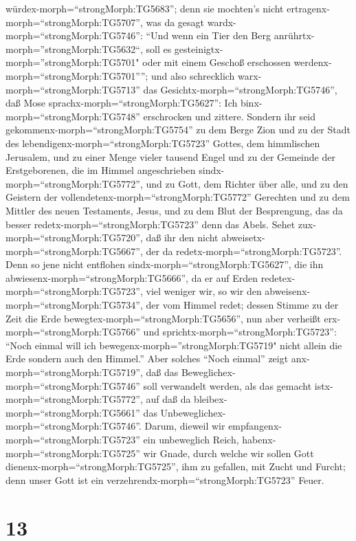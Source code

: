 würdex-morph=``strongMorph:TG5683'';  denn sie mochten's
nicht ertragenx-morph=``strongMorph:TG5707'', was da gesagt
wardx-morph=``strongMorph:TG5746'': ``Und wenn ein Tier den Berg
anrührtx-morph=''strongMorph:TG5632``, soll es
gesteinigtx-morph=''strongMorph:TG5701" oder mit einem Geschoß
erschossen werdenx-morph=``strongMorph:TG5701'''';  und
also schrecklich warx-morph=``strongMorph:TG5713'' das
Gesichtx-morph=``strongMorph:TG5746'', daß Mose
sprachx-morph=``strongMorph:TG5627'': Ich
binx-morph=``strongMorph:TG5748'' erschrocken und zittere. 
Sondern ihr seid gekommenx-morph=``strongMorph:TG5754'' zu dem Berge
Zion und zu der Stadt des lebendigenx-morph=``strongMorph:TG5723''
Gottes, dem himmlischen Jerusalem, und zu einer Menge vieler tausend
Engel  und zu der Gemeinde der Erstgeborenen, die im Himmel
angeschrieben sindx-morph=``strongMorph:TG5772'', und zu Gott, dem
Richter über alle, und zu den Geistern der
vollendetenx-morph=``strongMorph:TG5772'' Gerechten  und zu
dem Mittler des neuen Testaments, Jesus, und zu dem Blut der
Besprengung, das da besser redetx-morph=``strongMorph:TG5723'' denn das
Abels.  Sehet zux-morph=``strongMorph:TG5720'', daß ihr den
nicht abweisetx-morph=``strongMorph:TG5667'', der da
redetx-morph=``strongMorph:TG5723''. Denn so jene nicht entflohen
sindx-morph=``strongMorph:TG5627'', die ihn
abwiesenx-morph=``strongMorph:TG5666'', da er auf Erden
redetex-morph=``strongMorph:TG5723'', viel weniger wir, so wir den
abweisenx-morph=``strongMorph:TG5734'', der vom Himmel redet;
 dessen Stimme zu der Zeit die Erde
bewegtex-morph=``strongMorph:TG5656'', nun aber verheißt
erx-morph=``strongMorph:TG5766'' und
sprichtx-morph=``strongMorph:TG5723'': ``Noch einmal will ich
bewegenx-morph=''strongMorph:TG5719" nicht allein die Erde sondern auch
den Himmel.''  Aber solches ``Noch einmal'' zeigt
anx-morph=``strongMorph:TG5719'', daß das
Beweglichex-morph=``strongMorph:TG5746'' soll verwandelt werden, als das
gemacht istx-morph=``strongMorph:TG5772'', auf daß da
bleibex-morph=``strongMorph:TG5661'' das
Unbeweglichex-morph=``strongMorph:TG5746''.  Darum, dieweil
wir empfangenx-morph=``strongMorph:TG5723'' ein unbeweglich Reich,
habenx-morph=``strongMorph:TG5725'' wir Gnade, durch welche wir sollen
Gott dienenx-morph=``strongMorph:TG5725'', ihm zu gefallen, mit Zucht
und Furcht;  denn unser Gott ist ein
verzehrendx-morph=``strongMorph:TG5723'' Feuer.

\hypertarget{section-12}{%
\section{13}\label{section-12}}

